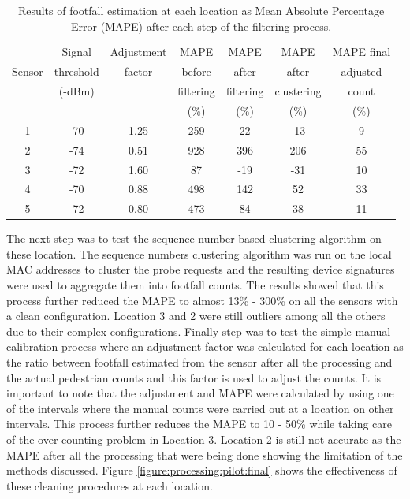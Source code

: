 \begin{centering}
\begin{table}
\footnotesize
\caption{Results of footfall estimation at each location as Mean Absolute Percentage Error (MAPE) after each step of the filtering process.}
{\begin{tabular}{ccccccc} 
\toprule
& Signal    & Adjustment & MAPE      & MAPE      & MAPE       & MAPE final \\
Sensor  & threshold & factor     & before    & after     & after    & adjusted\\
& (-dBm)    &            & filtering & filtering & clustering & count\\
&           &            & (\%)      & (\%)      & (\%)       & (\%)\\
\midrule
1 & -70 & 1.25 & 259 &  22 & -13 &  9 \\
2 & -74 & 0.51 & 928 & 396 & 206 & 55 \\
3 & -72 & 1.60 &  87 & -19 & -31 & 10 \\
4 & -70 & 0.88 & 498 & 142 &  52 & 33 \\
5 & -72 & 0.80 & 473 &  84 &  38 & 11 \\
\bottomrule
\end{tabular}}
\label{table:processing:pilot:results}
\end{table}
\end{centering}

The next step was to test the sequence number based clustering algorithm on these location. 
The sequence numbers clustering algorithm was run on the local MAC addresses to cluster the probe requests and the resulting device signatures were used to aggregate them into footfall counts. 
The results showed that this process further reduced the MAPE to almost 13\% - 300\% on all the sensors with a clean configuration.
Location 3 and 2 were still outliers among all the others due to their complex configurations. Finally step was to test the simple manual calibration process where an adjustment factor was calculated for each location as the ratio between footfall estimated from the sensor after all the processing and the actual pedestrian counts and this factor is used to adjust the counts.
It is important to note that the adjustment and MAPE were calculated by using one of the intervals where the manual counts were carried out at a location on other intervals.
This process further reduces the MAPE to 10 - 50\% while taking care of the over-counting problem in Location 3.
Location 2 is still not accurate as the MAPE after all the processing that were being done showing the limitation of the methods discussed.
Figure \ref{figure:processing:pilot:final} shows the effectiveness of these cleaning procedures at each location.

